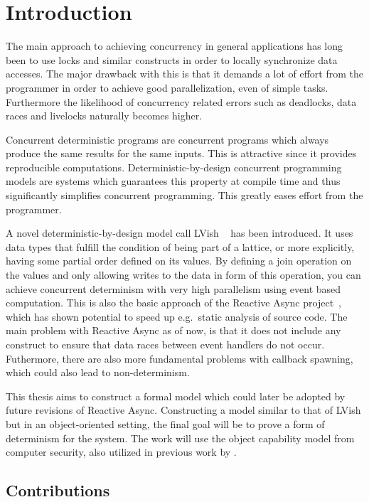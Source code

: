 \chapter{Introduction}
\label{cha:introduction}

The main approach to achieving concurrency in general applications has long been
to use locks and similar constructs in order to locally synchronize data
accesses. The major drawback with this is that it demands a lot of effort from
the programmer in order to achieve good parallelization, even of simple tasks.
Furthermore the likelihood of concurrency related errors such as deadlocks, data
races and livelocks naturally becomes higher. 

Concurrent deterministic programs are concurrent programs which always produce
the same results for the same inputs. This is attractive since it provides
reproducible computations.  Deterministic-by-design concurrent programming
models are systems which guarantees this property at compile time and thus
significantly simplifies concurrent programming. This greatly eases effort
from the programmer. 

A novel deterministic-by-design model call LVish ~\parencite{kuper2013lvars,
kuper2014freeze} has been introduced.  It uses data types that fulfill the
condition of being part of a lattice, or more explicitly, having some partial
order defined on its values. By defining a join operation on the values and only
allowing writes to the data in form of this operation, you can achieve concurrent
determinism with very high parallelism using event based computation.  This is
also the basic approach of the Reactive Async
project~\parencite{conf/scala/HallerGES16}, which has shown potential to speed up
e.g.\ static analysis of source code. The main problem with Reactive Async as
of now, is that it does not include any construct to ensure that data races
between event handlers do not occur. Futhermore, there are also more fundamental
problems with callback spawning, which could also lead to non-determinism.

This thesis aims to construct a formal model which could later be adopted by
future revisions of Reactive Async. Constructing a model similar to that
of LVish but in an object-oriented setting, the final goal
will be to prove a form of determinism for the system. The work will use
the object capability model from computer security, also utilized in previous
work by \textcite{conf/oopsla/HallerL16}.

\section{Contributions}%
\label{sec:contributions}

